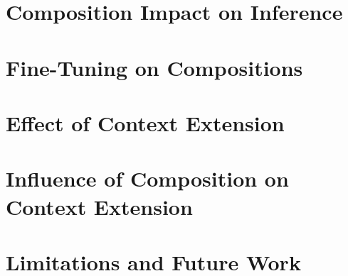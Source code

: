 \section{Composition Impact on Inference}\label{sec:composition-impact-on-inference}

\section{Fine-Tuning on Compositions}\label{sec:fine-tuning-on-compositions}

\section{Effect of Context Extension}\label{sec:effect-of-context-extension}

\section{Influence of Composition on Context Extension}\label{sec:influence-of-composition-on-context-extension}



\section{Limitations and Future Work}

